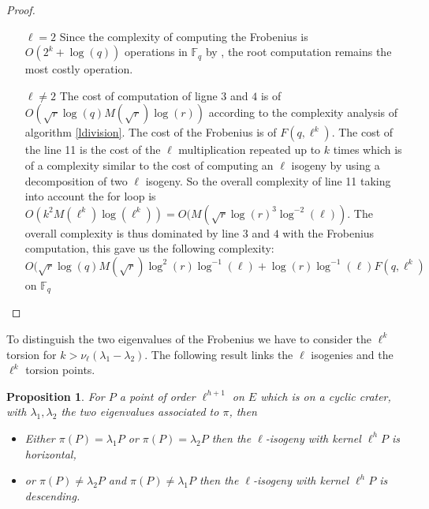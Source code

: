 \documentclass{lms}
\newtheorem{prop}[thm]{Proposition}
\begin{document}
\begin{proof}
\begin{enumerate}
\item[$\ell=2$]
Since the complexity of computing the Frobenius is $O(2^k+\log(q))$ operations in $\mathbb{F}_q$ by \cite{DBLP:journals/dcc/DoliskaniS15}, the root computation remains the most costly operation.
\item[$\ell \neq 2$] The cost of computation of ligne $3$ and $4$ is of $O(\sqrt{r} \log(q) M(\sqrt{r})\log(r))$ according to the complexity analysis of algorithm \ref{ldivision}. The cost of the Frobenius is of $F(q,\ell^k)$. The cost of the line 11 is the cost of the $\ell$ multiplication repeated up to $k$ times which is of a complexity similar to the cost of computing an $\ell$ isogeny by using a decomposition of two $\ell$ isogeny. So the overall complexity of line 11 taking into account the for loop is $O(k^2M(\ell^k)\log(\ell^k))=O(M(\sqrt{r}\log(r)^3\log^{-2}(\ell))$. The overall complexity is thus dominated by line $3$ and $4$ with the Frobenius computation, this gave us the following complexity: $O(\sqrt{r} \log(q) M(\sqrt{r})\log^2(r)\log^{-1}(\ell)+ \log(r)\log^{-1}(\ell) F(q,\ell^k)$ on $\mathbb{F}_q$
\end{enumerate}
\end{proof}


To distinguish the two eigenvalues of the Frobenius we have to consider the $\ell^k$ torsion for $k>\nu_{\ell}(\lambda_1-\lambda_2)$. The following result links the $\ell$ isogenies and the $\ell^k$ torsion points.

\begin{prop} \label{conjecture}
For $P$ a point of order $\ell^{h+1}$ on $E$ which is on a cyclic crater, with $\lambda_1, \lambda_2$ the two eigenvalues associated to $\pi$, then
\begin{itemize}
\item Either $\pi(P)=\lambda_1P$ or $\pi(P)=\lambda_2P$ then the $\ell$-isogeny with kernel $\ell^{h} P$ is horizontal,
\item or $\pi(P) \neq \lambda_2P$ and $\pi(P) \neq \lambda_1P$ then the $\ell$-isogeny with kernel $\ell^{h} P$ is descending.
\end{itemize} 
\end{prop}
\end{document}
